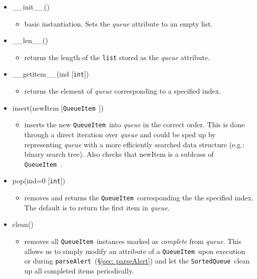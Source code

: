 \documentclass{article}
\newcommand{\parseAlert}{\texttt{parseAlert}~}
\newcommand{\SortedQueue}{\texttt{SortedQueue}~}
\newcommand{\QueueItem}{\texttt{QueueItem}~}
\begin{document}
\begin{itemize}
    \item{\_\_init\_\_()
        \begin{itemize}
            \item{basic instantiation. Sets the \textit{queue} attribute to an empty list.}
        \end{itemize}
         }
    \item{\_\_len\_\_()
        \begin{itemize}
            \item{returns the length of the \texttt{list} stored as the \textit{queue} attribute.}
        \end{itemize}
         }
    \item{\_\_getitem\_\_(ind [\texttt{int}])
        \begin{itemize}
            \item{returns the element of \textit{queue} corresponding to a specified index.}
        \end{itemize}
         }
    \item{insert(newItem [\QueueItem])
        \begin{itemize}
            \item{inserts the new \QueueItem into \textit{queue} in the correct order. This is done through a direct iteration over \textit{queue} and could be sped up by representing \textit{queue} with a more efficiently searched data structure (e.g.: binary search tree). Also checks that newItem is a sublcass of \QueueItem.}
        \end{itemize}
         }
    \item{pop(ind=0 [\texttt{int}])
        \begin{itemize}
            \item{removes and returns the \QueueItem corresponding the the specified index. The default is to return the first item in \textit{queue}.}
        \end{itemize}
         }
    \item{clean()
        \begin{itemize}
            \item{removes all \QueueItem instances marked as \textit{complete} from \textit{queue}. This allows us to simply modify an attribute of a \QueueItem upon execution or during \parseAlert (\S\ref{sec: parseAlert}) and let the \SortedQueue clean up all completed items periodically.}
        \end{itemize}
         }
\end{itemize}
\end{document}

